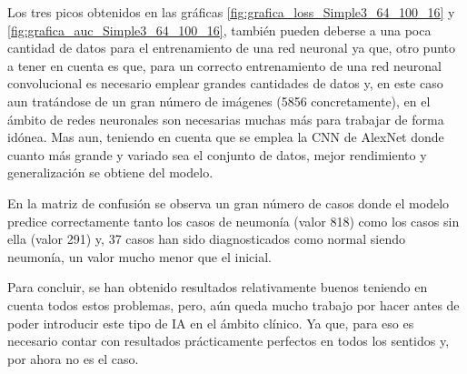 Los tres picos obtenidos en las gráficas \ref{fig:grafica_loss_Simple3_64_100_16} y \ref{fig:grafica_auc_Simple3_64_100_16}, también pueden deberse a una poca cantidad de datos para el entrenamiento de una red neuronal ya que, otro punto a tener en cuenta es que, para un correcto entrenamiento de una red neuronal convolucional es necesario emplear grandes cantidades de datos \cite{kundu2021pneumonia} y, en este caso aun tratándose de un gran número de imágenes (5856 concretamente), en el ámbito de redes neuronales son necesarias muchas más para trabajar de forma idónea. Mas aun, teniendo en cuenta que se emplea la CNN de AlexNet donde cuanto más grande y variado sea el conjunto de datos, mejor rendimiento y generalización se obtiene del modelo.

En la matriz de confusión se observa un gran número de casos donde el modelo predice correctamente tanto los casos de neumonía (valor 818) como los casos sin ella (valor 291) y, 37 casos han sido diagnosticados como normal siendo neumonía, un valor mucho menor que el inicial.

Para concluir, se han obtenido resultados relativamente buenos teniendo en cuenta todos estos problemas, pero, aún queda mucho trabajo por hacer antes de poder introducir este tipo de IA en el ámbito clínico. Ya que, para eso es necesario contar con resultados prácticamente perfectos en todos los sentidos y, por ahora no es el caso.





